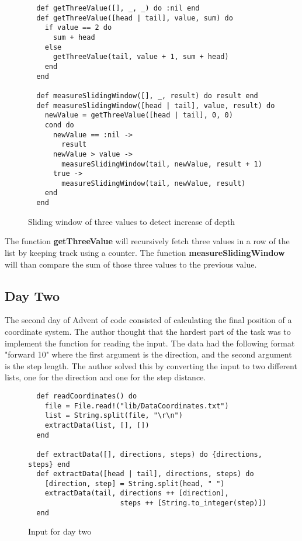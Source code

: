 \documentclass[a4paper,11pt]{article}
\begin{document}
\begin{figure}[H]
\begin{verbatim}
  def getThreeValue([], _, _) do :nil end
  def getThreeValue([head | tail], value, sum) do
    if value == 2 do
      sum + head
    else
      getThreeValue(tail, value + 1, sum + head)
    end
  end

  def measureSlidingWindow([], _, result) do result end
  def measureSlidingWindow([head | tail], value, result) do
    newValue = getThreeValue([head | tail], 0, 0)
    cond do
      newValue == :nil ->
        result
      newValue > value ->
        measureSlidingWindow(tail, newValue, result + 1)
      true ->
        measureSlidingWindow(tail, newValue, result)
    end
  end
\end{verbatim}
\caption{Sliding window of three values to detect increase of depth}
\label{Figure:4}
\end{figure}

The function \textbf{getThreeValue} will recursively fetch three values in a row of the list by keeping track using a counter. The function \textbf{measureSlidingWindow} will than compare the sum of those three values to the previous value.

\subsection*{Day Two}
The second day of Advent of code consisted of calculating the final position of a coordinate system. The author thought that the hardest part of the task was to implement the function for reading the input. The data had the following format "forward 10" where the first argument is the direction, and the second argument is the step length. The author solved this by converting the input to two different lists, one for the direction and one for the step distance.

\begin{figure}[H]
\begin{verbatim}
  def readCoordinates() do
    file = File.read!("lib/DataCoordinates.txt")
    list = String.split(file, "\r\n")
    extractData(list, [], [])
  end
  
  def extractData([], directions, steps) do {directions, steps} end
  def extractData([head | tail], directions, steps) do
    [direction, step] = String.split(head, " ")
    extractData(tail, directions ++ [direction],
                      steps ++ [String.to_integer(step)])
  end
\end{verbatim}
\caption{Input for day two}
\label{Figure:5}
\end{figure}
\end{document}
